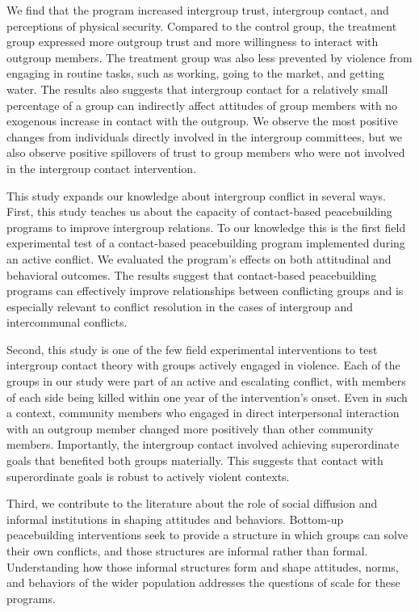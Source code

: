 \documentclass[11pt]{article}
\begin{document}
We find that the program increased intergroup trust, intergroup contact,
and perceptions of physical security. Compared to the control group, the
treatment group expressed more outgroup trust and more willingness to
interact with outgroup members. The treatment group was also less
prevented by violence from engaging in routine tasks, such as working,
going to the market, and getting water. The results also suggests that
intergroup contact for a relatively small percentage of a group can
indirectly affect attitudes of group members with no exogenous increase
in contact with the outgroup. We observe the most positive changes from
individuals directly involved in the intergroup committees, but we also
observe positive spillovers of trust to group members who were not
involved in the intergroup contact intervention.

This study expands our knowledge about intergroup conflict in several
ways. First, this study teaches us about the capacity of contact-based
peacebuilding programs to improve intergroup relations. To our knowledge
this is the first field experimental test of a contact-based
peacebuilding program implemented during an active conflict. We
evaluated the program's effects on both attitudinal and behavioral
outcomes. The results suggest that contact-based peacebuilding programs
can effectively improve relationships between conflicting groups and is
especially relevant to conflict resolution in the cases of intergroup
and intercommunal conflicts.

Second, this study is one of the few field experimental interventions to
test intergroup contact theory with groups actively engaged in violence.
Each of the groups in our study were part of an active and escalating
conflict, with members of each side being killed within one year of the
intervention's onset. Even in such a context, community members who
engaged in direct interpersonal interaction with an outgroup member
changed more positively than other community members. Importantly, the
intergroup contact involved achieving superordinate goals that benefited
both groups materially. This suggests that contact with superordinate
goals is robust to actively violent contexts.

Third, we contribute to the literature about the role of social
diffusion and informal institutions in shaping attitudes and behaviors.
Bottom-up peacebuilding interventions seek to provide a structure in
which groups can solve their own conflicts, and those structures are
informal rather than formal. Understanding how those informal structures
form and shape attitudes, norms, and behaviors of the wider population
addresses the questions of scale for these programs.
\end{document}
